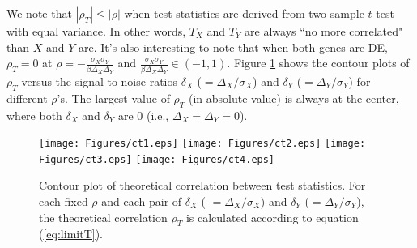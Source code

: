 	We note that $|\rho_T| \leq |\rho|$ when test statistics are derived from two sample $t$ test 
	with equal variance. In other words, $T_X$ and $T_Y$ are always ``no more correlated" than $X$ 
	and $Y$ are. It's also interesting to note that when both genes are DE, $\rho_T=0$ at $\rho 
	=-\frac{\sigma_X\sigma_Y}{\beta\Delta_X\Delta_Y} $ and 
	$\frac{\sigma_X\sigma_Y}{\beta\Delta_X\Delta_Y} \in (-1, 1)$. Figure \ref{fig:ct} shows the 
	contour plots of $\rho_T$ versus the signal-to-noise ratios $\delta_X$ ($=\Delta_X/\sigma_X$) 
	and $\delta_Y$ ($=\Delta_Y/\sigma_Y$) for different $\rho$'s. The largest value of $\rho_T$ (in 
	absolute value) 
	is always at the center, where both $\delta_X$ and $\delta_Y$ are 0 (i.e., $\Delta_X =\Delta_Y 
	= 0$).
	
	\begin{figure}[!ht]
		\centering
		\texttt{[image: Figures/ct1.eps]}
		\texttt{[image: Figures/ct2.eps]}
		\texttt{[image: Figures/ct3.eps]}
		\texttt{[image: Figures/ct4.eps]}
		\caption{Contour plot of theoretical correlation between test statistics. For 
			each fixed $\rho$ and each pair of $\delta_X$ (	$=\Delta_X/\sigma_X$) 
			and $\delta_Y$ ($=\Delta_Y/\sigma_Y$), the theoretical correlation $\rho_T$ is 
			calculated according to equation (\ref{eq:limitT}).}
		\label{fig:ct}
	\end{figure}
	
